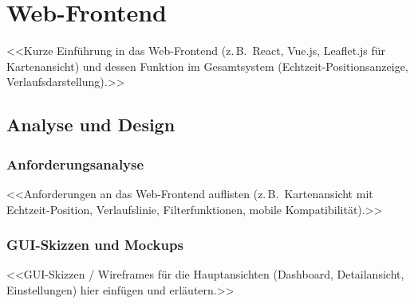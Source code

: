
\section{Web-Frontend}
\label{sec:frontend}

<<Kurze Einführung in das Web-Frontend (z.\,B.\ React, Vue.js, Leaflet.js für
Kartenansicht) und dessen Funktion im Gesamtsystem (Echtzeit-Positionsanzeige,
Verlaufsdarstellung).>>

\subsection{Analyse und Design}

\subsubsection{Anforderungsanalyse}
<<Anforderungen an das Web-Frontend auflisten (z.\,B.\ Kartenansicht mit
Echtzeit-Position, Verlaufslinie, Filterfunktionen, mobile Kompatibilität).>>

\subsubsection{GUI-Skizzen und Mockups}
<<GUI-Skizzen / Wireframes für die Hauptansichten (Dashboard, Detailansicht,
Einstellungen) hier einfügen und erläutern.>>


